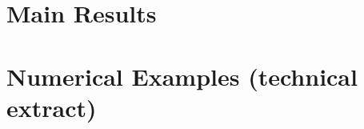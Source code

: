 \documentclass[11pt,a4paper]{article}
\theoremstyle{plain}
\theoremstyle{definition}
\theoremstyle{remark}
\begin{document}
\section{Main Results}
\label{sec:results}




\section{Numerical Examples (technical extract)}
\label{sec:numerical}


\label{sec:conclusion}

\appendix




\end{document}
